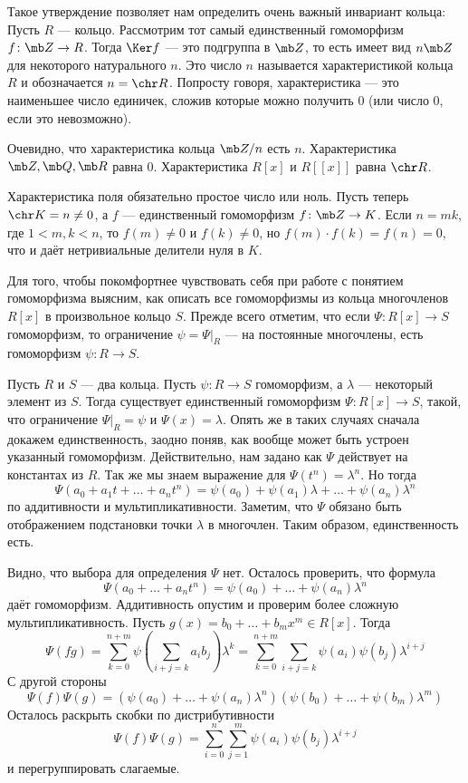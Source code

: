 Такое утверждение позволяет нам определить очень важный инвариант кольца:
\dfn Пусть $R$ --- кольцо. Рассмотрим тот самый единственный гомоморфизм $f\colon \mb Z \to R$. Тогда $\Ker f$
--- это подгруппа в $\mb Z$, то есть имеет вид $n\mb Z$ для некоторого натурального $n$. Это число $n$ называется характеристикой кольца $R$ и обозначается $n=\chr R$. Попросту говоря, характеристика --- это наименьшее число единичек, сложив которые можно получить $0$ (или число $0$, если это невозможно).
\edfn

Очевидно, что характеристика кольца $\mb Z/n$ есть $n$. Характеристика $\mb Z, \mb Q,\mb  R$  равна $0$. Характеристика $R[x]$ и $R[[x]]$ равна $\chr R$.

\rm Характеристика поля обязательно простое число или ноль. \proof  Пусть теперь $\chr K=n\neq 0$, а $f$ --- единственный гомоморфизм $f\colon \mb Z \to K$. Если $n=mk$, где $1<m,k< n$, то $f(m)\neq 0$ и $f(k)\neq 0$, но $f(m)\cdot f(k)=f(n)=0$, что и даёт нетривиальные делители нуля в $K$.
\endproof
\erm



Для того, чтобы покомфортнее чувствовать себя при работе с понятием гомоморфизма выясним, как описать все
гомоморфизмы из кольца многочленов $R[x]$ в произвольное кольцо $S$. Прежде всего отметим, что если $\Psi \colon R[x]\to S$ гомоморфизм, то ограничение $\psi= \Psi|_{R}$ --- на постоянные многочлены, есть гомоморфизм $\psi \colon R \to S$.

\thrm Пусть $R$ и $S$ --- два кольца. Пусть $\psi \colon R \to S$ гомоморфизм, а $\lambda$ --- некоторый элемент из $S$. Тогда
существует единственный гомоморфизм $\Psi \colon R[x]\to S$, такой, что ограничение $\Psi|_{R}=\psi$ и $\Psi(x)=\lambda$.
\ethrm
\proof Опять же в таких случаях сначала докажем единственность, заодно поняв, как вообще может быть устроен указанный гомоморфизм.
Действительно, нам задано как $\Psi$ действует на константах из $R$. Так же мы знаем выражение для $\Psi(t^n)= \lambda^n$. Но тогда 
$$\Psi(a_0+ a_1 t+\dots+a_nt^n)=\psi(a_0)+\psi(a_1)\lambda+\dots+\psi(a_n)\lambda^n$$
по аддитивности и мультипликативности. Заметим, что $\Psi$ обязано быть отображением подстановки точки $\lambda$ в многочлен. Таким образом, единственность есть.

Видно, что выбора для определения $\Psi$ нет. Осталось проверить, что формула $$\Psi(a_0+\dots+a_nt^n)=\psi(a_0)+\dots+\psi(a_n)\lambda^n$$
даёт гомоморфизм. Аддитивность опустим и проверим более сложную мультипликативность. Пусть $g(x)=b_0+\dots+b_mx^m\in R[x]$. 
Тогда 
$$\Psi(fg)=\sum_{k=0}^{n+m}\psi\left(\sum_{i+j=k} a_ib_j \right)\lambda^k=\sum_{k=0}^{n+m}\sum_{i+j=k} \psi(a_i)\psi(b_j) \lambda^{i+j}$$
С другой стороны 
$$\Psi(f)\Psi(g)=\left(\psi(a_0)+\dots+\psi(a_n)\lambda^n\right)\left(\psi(b_0)+\dots+\psi(b_m)\lambda^m\right)$$
Осталось раскрыть скобки по дистрибутивности
$$\Psi(f)\Psi(g)=\sum_{i=0}^{n}\sum_{j=1}^m \psi(a_i)\psi(b_j) \lambda^{i+j}$$
и перегруппировать слагаемые.
\endproof







